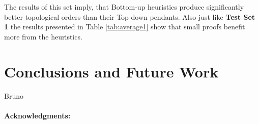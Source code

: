 \documentclass{llncs}
\begin{document}
The results of this set imply, that Bottom-up heuristics produce significantly better topological orders than their Top-down pendants.
Also just like \textbf{Test Set 1} the results presented in Table \ref{tab:average1} show that small proofs benefit more from the heuristics.

\section{Conclusions and Future Work}

Bruno


\vspace{-10pt}
\paragraph{Acknowledgments:}





\end{document}
